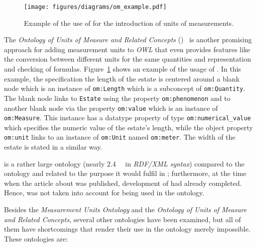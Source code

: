 \begin{figure}
\centering
\texttt{[image: figures/diagrams/om\_example.pdf]}
\caption{Example of the use of  for the introduction of units of measurements.}
\label{fig:om_example}
\end{figure}

The \emph{Ontology of Units of Measure and Related Concepts} ()~\cite{OMWeb,OM} is another promising approach for adding measurement units to \emph{OWL} that even provides features like the conversion between different units for the same quantities and representation and checking of formulas. Figure~\ref{fig:om_example} shows an example of the usage of . In this example, the specification the length of the estate is centered around a blank node which is an instance of \texttt{om:Length} which is a subconcept of \texttt{om:Quantity}. The blank node links to \texttt{Estate} using the property \texttt{om:phenomenon} and to another blank node via the property \texttt{om:value} which is an instance of \texttt{om:Measure}. This instance has a datatype property of type \texttt{om:numerical\_value} which specifies the numeric value of the estate's length, while the object property \texttt{om:unit}
links to an instance of \texttt{om:Unit} named \texttt{om:meter}. The width of the estate is stated in a similar way.

 is a rather large ontology (nearly \SI{2.4}{\mebi\byte} in \emph{RDF/XML syntax}) compared to the \smarthomeweather ontology and related to the purpose it would fulfil in \smarthomeweather; furthermore, at the time when the article about  was published, development of \smarthomeweather had already completed. Hence,  was not taken into account for being used in the \smarthomeweather ontology.

Besides the \emph{Measurement Units Ontology} and the \emph{Ontology of Units of Measure and Related Concepts}, several other ontologies have been examined, but all of them have shortcomings that render their use in the \smarthomeweather ontology merely impossible. These ontologies are:

